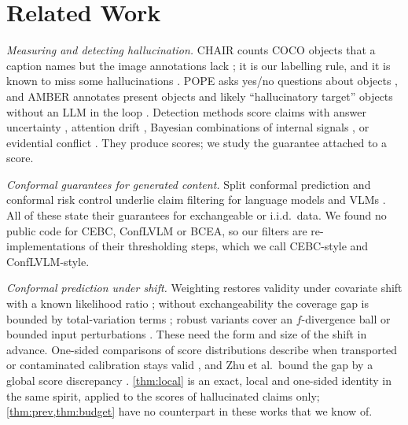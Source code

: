 \documentclass[journal]{IEEEtran}
\theoremstyle{remark}\newtheorem{remark}{Remark}
\begin{document}
\section{Related Work}\label{sec:related}
\emph{Measuring and detecting hallucination.} CHAIR counts COCO objects \cite{lin2014microsoft} that a caption names but the image annotations lack \cite{rohrbach2018chair}; it is our labelling rule, and it is known to miss some hallucinations \cite{petryk2024aloha}. POPE asks yes/no questions about objects \cite{li2023pope}, and AMBER annotates present objects and likely ``hallucinatory target'' objects without an LLM in the loop \cite{wang2023amber}. Detection methods score claims with answer uncertainty \cite{zhang2024vluncertainty}, attention drift \cite{wen2026cadmp}, Bayesian combinations of internal signals \cite{zohrabi2026haloprobe}, or evidential conflict \cite{huang2025evidential}. They produce scores; we study the guarantee attached to a score.

\emph{Conformal guarantees for generated content.} Split conformal prediction \cite{vovk2005algorithmic,angelopoulos2023gentle} and conformal risk control \cite{angelopoulos2022conformal} underlie claim filtering for language models \cite{mohri2024language,cherian2024large} and VLMs \cite{conflvlm,cebc,xu2026bcea,atabuzzaman2026introconformal}. All of these state their guarantees for exchangeable or i.i.d.\ data. We found no public code for CEBC, ConfLVLM or BCEA, so our filters are re-implementations of their thresholding steps, which we call CEBC-style and ConfLVLM-style.

\emph{Conformal prediction under shift.} Weighting restores validity under covariate shift with a known likelihood ratio \cite{tibshirani2019covariate}; without exchangeability the coverage gap is bounded by total-variation terms \cite{barber2023beyond}; robust variants cover an $f$-divergence ball \cite{cauchois2024robust} or bounded input perturbations \cite{gendler2022adversarially}. These need the form and size of the shift in advance. One-sided comparisons of score distributions describe when transported or contaminated calibration stays valid \cite{doula2026conformal,clarkson2024split,lee2026diagnosing}, and Zhu et al.\ bound the gap by a global score discrepancy \cite{zhu2026configuration}. \cref{thm:local} is an exact, local and one-sided identity in the same spirit, applied to the scores of hallucinated claims only; \cref{thm:prev,thm:budget} have no counterpart in these works that we know of.
\end{document}
